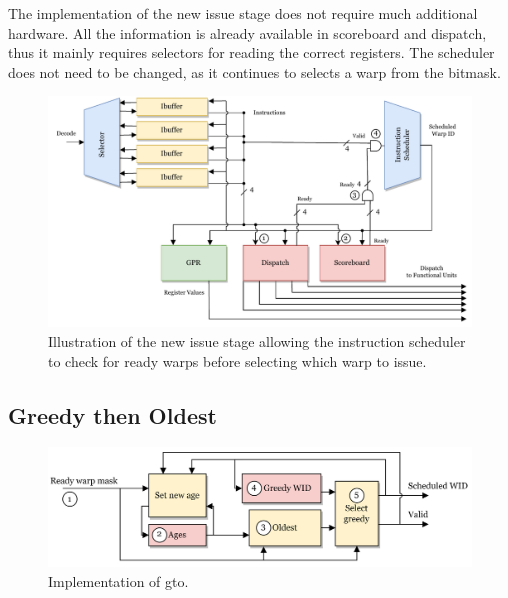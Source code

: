 The implementation of the new issue stage does not require much additional hardware. All the information is already available in scoreboard and dispatch, thus it mainly requires selectors for reading the correct registers. The scheduler does not need to be changed, as it continues to selects a warp from the bitmask. 

\begin{figure}
    \centering
    \includegraphics[width=\textwidth]{figures/new_issue_stage.pdf}
    \caption[Illustration of the new issue stage.]{Illustration of the new issue stage allowing the instruction scheduler to check for ready warps before selecting which warp to issue.}
    \label{fig:new_issue_stage}
\end{figure}


\subsection{Greedy then Oldest}

\begin{figure}
    \centering
    \includegraphics[width=\textwidth]{figures/gto_numbers.png}
    \caption{Implementation of \acrfull{gto}.}
    \label{fig:gto_impl}
\end{figure}

